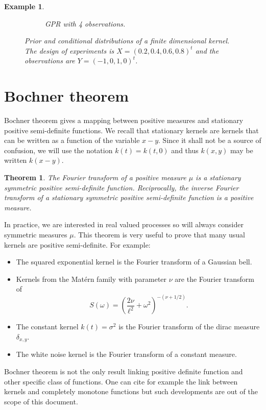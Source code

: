 \documentclass[twoside,openright]{report}
\newtheorem{theorem}{Theorem}
\newtheorem{example}{Example}
\begin{document}
\begin{example}
\begin{figure}[ht!]
\begin{subfigure}[t]{0.30\textwidth}
                \caption{GPR with 4 observations.}
        \end{subfigure}
        \caption{Prior and conditional distributions of a finite dimensional kernel. The design of experiments is $X=(0.2, 0.4, 0.6, 0.8)^t$ and the observations are $Y=(-1,0,1,0)^t$.}
        \label{fig:ch5_findimkern}
    \end{figure}
\end{example}

\section{Bochner theorem}
Bochner theorem gives a mapping between positive measures and stationary positive semi-definite functions. We recall that stationary kernels are kernels that can be written as a function of the variable $x-y$. Since it shall not be a source of confusion, we will use the notation $k(t) = k(t,0)$ and thus $k(x,y)$ may be written $k(x-y)$.
\begin{theorem}
\label{thm:bochner}
The Fourier transform of a positive measure $\mu$ is a stationary symmetric positive semi-definite function. Reciprocally, the inverse Fourier transform of a stationary symmetric positive semi-definite function is a positive measure.
\end{theorem}
In practice, we are interested in real valued processes so will always consider symmetric measures $\mu$. This theorem is very useful to prove that many usual kernels are positive semi-definite. For example:
\begin{itemize}
        \item The squared exponential kernel is the Fourier transform of a Gaussian bell.
        \item Kernels from the Mat\'ern family with parameter $\nu$ are the Fourier transform of 
\begin{equation}
S(\omega) =  \left( \frac{2 \nu}{\ell ^2} + \omega ^2 \right)^{-(\nu+1/2)}.
\label{eq:SDmat}
\end{equation}
        \item The constant kernel $k(t) = \sigma^2$ is the Fourier transform of the dirac measure $\delta_{x,y}$.
        \item The white noise kernel is the Fourier transform of a constant measure.
\end{itemize}

Bochner theorem is not the only result linking positive definite function and other specific class of functions. One can cite for example the link between kernels and completely monotone functions but such developments are out of the scope of this document. 
\end{document}
